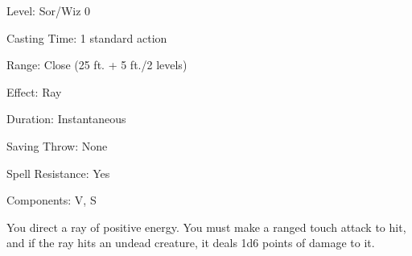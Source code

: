 
\begin{description*}
\item[Level:] Sor/Wiz 0
\item[Casting Time:] 1 standard action
\item[Range:] Close (25 ft. + 5 ft./2 levels)
\item[Effect:] Ray
\item[Duration:] Instantaneous
\item[Saving Throw:] None
\item[Spell Resistance:] Yes
\item[Components:] V, S
\end{description*}

You direct a ray of positive energy. You must make a ranged touch attack to hit,
and if the ray hits an undead creature, it deals 1d6 points of damage to it.